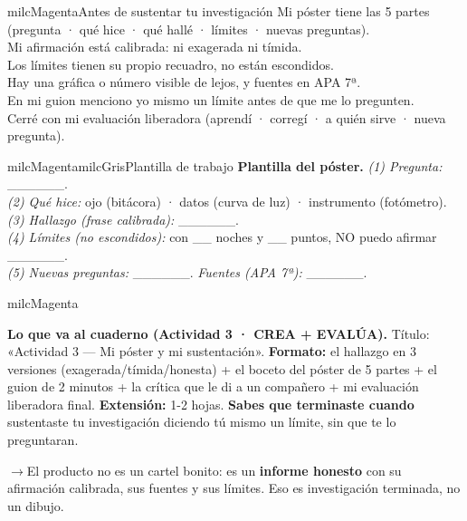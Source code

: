 \documentclass[11pt,letterpaper]{article}
\newcommand{\puente}[1]{%
  \begin{puentebox}%
    \textcolor{milcGradeDark}{$\rightarrow$}\hspace{2mm}#1%
  \end{puentebox}%
}
\newcommand{\checkbox}{\textcolor{milcGradeDark}{\fbox{\phantom{x}}}\hspace{5pt}}
\begin{document}
\begin{drawbox}{milcMagenta}{Antes de sustentar tu investigación}
\checkbox Mi póster tiene las 5 partes (pregunta · qué hice · qué hallé · límites · nuevas preguntas). \\[1mm]
\checkbox Mi afirmación está calibrada: ni exagerada ni tímida. \\[1mm]
\checkbox Los límites tienen su propio recuadro, no están escondidos. \\[1mm]
\checkbox Hay una gráfica o número visible de lejos, y fuentes en APA 7ª. \\[1mm]
\checkbox En mi guion menciono yo mismo un límite antes de que me lo pregunten. \\[1mm]
\checkbox Cerré con mi evaluación liberadora (aprendí · corregí · a quién sirve · nueva pregunta).
\end{drawbox}

\begin{softbox}{milcMagenta}{milcGris}{Plantilla de trabajo}
\textbf{Plantilla del póster.} \textit{(1) Pregunta:} \_\_\_\_\_\_. \\[1mm]
\textit{(2) Qué hice:} ojo (bitácora) · datos (curva de luz) · instrumento (fotómetro). \\[1mm]
\textit{(3) Hallazgo (frase calibrada):} \_\_\_\_\_\_. \\[1mm]
\textit{(4) Límites (no escondidos):} con \_\_ noches y \_\_ puntos, NO puedo afirmar \_\_\_\_\_\_. \\[1mm]
\textit{(5) Nuevas preguntas:} \_\_\_\_\_\_. \quad \textit{Fuentes (APA 7ª):} \_\_\_\_\_\_.
\end{softbox}

\begin{infoband}{milcMagenta}


\textbf{Lo que va al cuaderno (Actividad 3 · CREA + EVALÚA).} Título: «Actividad 3 --- Mi póster y mi sustentación». \textbf{Formato:} el hallazgo en 3 versiones (exagerada/tímida/honesta) + el boceto del póster de 5 partes + el guion de 2 minutos + la crítica que le di a un compañero + mi evaluación liberadora final. \textbf{Extensión:} 1-2 hojas. \textbf{Sabes que terminaste cuando} sustentaste tu investigación diciendo tú mismo un límite, sin que te lo preguntaran.
\end{infoband}

\puente{El producto no es un cartel bonito: es un \textbf{informe honesto} con su afirmación calibrada, sus fuentes y sus límites. Eso es investigación terminada, no un dibujo.}
\end{document}
